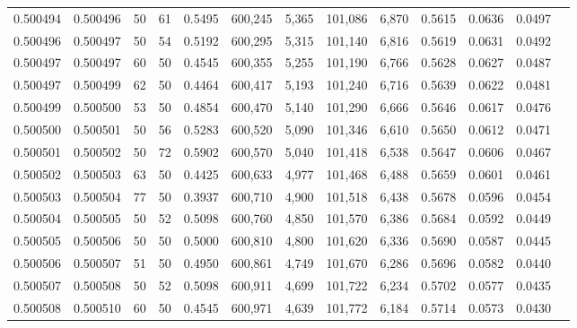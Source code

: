 \begin{tabular}{rrrrrrrrrrrrr}
0.500494 & 0.500496 &    50 &  61 &                                     0.5495 & 600,245 &   5,365 & 101,086 &   6,870 & 0.5615 & 0.0636 & 0.0497 \\
0.500496 & 0.500497 &    50 &  54 &                                     0.5192 & 600,295 &   5,315 & 101,140 &   6,816 & 0.5619 & 0.0631 & 0.0492 \\
0.500497 & 0.500497 &    60 &  50 &                                     0.4545 & 600,355 &   5,255 & 101,190 &   6,766 & 0.5628 & 0.0627 & 0.0487 \\
0.500497 & 0.500499 &    62 &  50 &                                     0.4464 & 600,417 &   5,193 & 101,240 &   6,716 & 0.5639 & 0.0622 & 0.0481 \\
0.500499 & 0.500500 &    53 &  50 &                                     0.4854 & 600,470 &   5,140 & 101,290 &   6,666 & 0.5646 & 0.0617 & 0.0476 \\
0.500500 & 0.500501 &    50 &  56 &                                     0.5283 & 600,520 &   5,090 & 101,346 &   6,610 & 0.5650 & 0.0612 & 0.0471 \\
0.500501 & 0.500502 &    50 &  72 &                                     0.5902 & 600,570 &   5,040 & 101,418 &   6,538 & 0.5647 & 0.0606 & 0.0467 \\
0.500502 & 0.500503 &    63 &  50 &                                     0.4425 & 600,633 &   4,977 & 101,468 &   6,488 & 0.5659 & 0.0601 & 0.0461 \\
0.500503 & 0.500504 &    77 &  50 &                                     0.3937 & 600,710 &   4,900 & 101,518 &   6,438 & 0.5678 & 0.0596 & 0.0454 \\
0.500504 & 0.500505 &    50 &  52 &                                     0.5098 & 600,760 &   4,850 & 101,570 &   6,386 & 0.5684 & 0.0592 & 0.0449 \\
0.500505 & 0.500506 &    50 &  50 &                                     0.5000 & 600,810 &   4,800 & 101,620 &   6,336 & 0.5690 & 0.0587 & 0.0445 \\
0.500506 & 0.500507 &    51 &  50 &                                     0.4950 & 600,861 &   4,749 & 101,670 &   6,286 & 0.5696 & 0.0582 & 0.0440 \\
0.500507 & 0.500508 &    50 &  52 &                                     0.5098 & 600,911 &   4,699 & 101,722 &   6,234 & 0.5702 & 0.0577 & 0.0435 \\
0.500508 & 0.500510 &    60 &  50 &                                     0.4545 & 600,971 &   4,639 & 101,772 &   6,184 & 0.5714 & 0.0573 & 0.0430 \\

\end{tabular}

